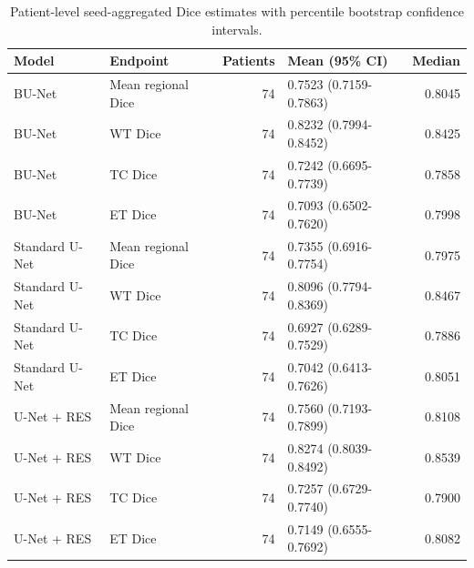 \begin{table}[htbp]
\caption{Patient-level seed-aggregated Dice estimates with percentile bootstrap confidence intervals.}
\label{tab:table03_internal_test_dice}
\begin{tabular}{llrlr}
\toprule
Model & Endpoint & Patients & Mean (95\% CI) & Median \\
\midrule
BU-Net & Mean regional Dice & 74 & 0.7523 (0.7159-0.7863) & 0.8045 \\
BU-Net & WT Dice & 74 & 0.8232 (0.7994-0.8452) & 0.8425 \\
BU-Net & TC Dice & 74 & 0.7242 (0.6695-0.7739) & 0.7858 \\
BU-Net & ET Dice & 74 & 0.7093 (0.6502-0.7620) & 0.7998 \\
Standard U-Net & Mean regional Dice & 74 & 0.7355 (0.6916-0.7754) & 0.7975 \\
Standard U-Net & WT Dice & 74 & 0.8096 (0.7794-0.8369) & 0.8467 \\
Standard U-Net & TC Dice & 74 & 0.6927 (0.6289-0.7529) & 0.7886 \\
Standard U-Net & ET Dice & 74 & 0.7042 (0.6413-0.7626) & 0.8051 \\
U-Net + RES & Mean regional Dice & 74 & 0.7560 (0.7193-0.7899) & 0.8108 \\
U-Net + RES & WT Dice & 74 & 0.8274 (0.8039-0.8492) & 0.8539 \\
U-Net + RES & TC Dice & 74 & 0.7257 (0.6729-0.7740) & 0.7900 \\
U-Net + RES & ET Dice & 74 & 0.7149 (0.6555-0.7692) & 0.8082 \\
\bottomrule
\end{tabular}
\end{table}
